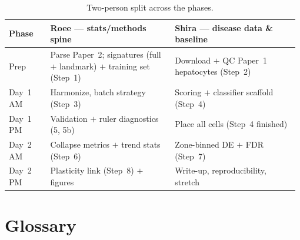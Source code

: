 \documentclass[11pt]{article}
\begin{document}
\begin{table}[h]
\centering\small
\caption{Two-person split across the phases.}
\label{tab:split}
\begin{tabular}{@{}p{0.14\linewidth} p{0.42\linewidth} p{0.42\linewidth}@{}}
\toprule
\textbf{Phase} & \textbf{Roee --- stats/methods spine} & \textbf{Shira --- disease data \& baseline}\\
\midrule
Prep & Parse Paper~2; signatures (full $+$ landmark) $+$ training set (Step~1) & Download $+$ QC Paper~1
hepatocytes (Step~2)\\
Day~1 AM & Harmonize, batch strategy (Step~3) & Scoring $+$ classifier scaffold (Step~4)\\
Day~1 PM & Validation $+$ ruler diagnostics (5, 5b) & Place all cells (Step~4 finished)\\
Day~2 AM & Collapse metrics $+$ trend stats (Step~6) & Zone-binned DE $+$ FDR (Step~7)\\
Day~2 PM & Plasticity link (Step~8) $+$ figures & Write-up, reproducibility, stretch\\
\bottomrule
\end{tabular}
\end{table}

\clearpage
\section{Glossary}
\end{document}
